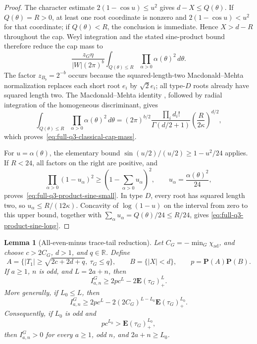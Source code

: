 \documentclass[11pt,reqno]{amsart}
\theoremstyle{plain}
\newtheorem{lemma}[theorem]{Lemma}
\theoremstyle{definition}
\newcommand{\chiad}{\chi_{\mathrm{ad}}}
\begin{document}
\begin{proof}
The character estimate $2(1-\cos u)\leq u^2$ gives
$d-X\leq Q(\theta)$.  If $Q(\theta)=R>0$, at least one root coordinate is
nonzero and $2(1-\cos u)<u^2$ for that coordinate; if $Q(\theta)<R$, the
conclusion is immediate.  Hence $X>d-R$ throughout the cap.  Weyl
integration and the stated sine-product bound
therefore reduce the cap mass to
\[
 \frac{z_G\eta}{|W|(2\pi)^b}
 \int_{Q(\theta)\leq R}\prod_{\alpha>0}\alpha(\theta)^2\,d\theta.
\]
The factor $z_{B_b}=2^{-b}$ occurs because the squared-length-two
Macdonald--Mehta normalization replaces each short root $e_i$ by
$\sqrt2e_i$; all type-$D$ roots already have squared length two.  The
Macdonald--Mehta identity
\cite[Theorem~3.1(i)]{Etingof2009}, followed by radial integration of the
homogeneous discriminant, gives
\[
 \int_{Q(\theta)\leq R}\prod_{\alpha>0}\alpha(\theta)^2\,d\theta
 =(2\pi)^{b/2}\frac{\prod_i d_i!}{\Gamma(d/2+1)}
 \left(\frac{R}{2\kappa}\right)^{d/2},
\]
which proves~\eqref{eq:full-q3-classical-cap-mass}.

For $u=\alpha(\theta)$, the elementary bound
$\sin(u/2)/(u/2)\geq1-u^2/24$ applies.  If $R<24$, all factors on the
right are positive, and
\[
 \prod_{\alpha>0}(1-u_\alpha)^2
 \geq\left(1-\sum_{\alpha>0}u_\alpha\right)^2,
 \qquad u_\alpha=\frac{\alpha(\theta)^2}{24},
\]
proves~\eqref{eq:full-q3-product-sine-small}.  In type $D$, every root has
squared length two, so
$u_\alpha\leq R/(12\kappa)$.  Concavity of $\log(1-u)$ on the interval
from zero to this upper bound, together with
$\sum_\alpha u_\alpha=Q(\theta)/24\leq R/24$, gives
\eqref{eq:full-q3-product-sine-long}.
\end{proof}

\begin{lemma}[All-even-minus trace-tail reduction]
\label{lem:all-minus-trace-tail}
Let $C_G=-\min_G\chiad$, and choose $c>2C_G$, $d>1$, and
$q\in\mathbb R$.  Define
\[
 A=\{|T_1|\geq\sqrt{2c+2d+q},\ \tau_G\leq q\},
 \qquad B=\{|X|<d\},
 \qquad p=\mathbf P(A)\mathbf P(B).
\]
If $a\geq1$, $n$ is odd, and $L=2a+n$, then
\begin{equation}
\label{eq:all-minus-base-tail}
 I^G_{a,n}\geq 2pc^L-2\mathbf E(\tau_G)_+^L.
\end{equation}
More generally, if $L_0\leq L$, then
\begin{equation}
\label{eq:all-minus-propagated-tail}
 I^G_{a,n}\geq
 2pc^L-2(2C_G)^{L-L_0}\mathbf E(\tau_G)_+^{L_0}.
\end{equation}
Consequently, if $L_0$ is odd and
\begin{equation}
\label{eq:all-minus-tail-test}
 pc^{L_0}>\mathbf E(\tau_G)_+^{L_0},
\end{equation}
then $I^G_{a,n}>0$ for every $a\geq1$, odd $n$, and
$2a+n\geq L_0$.
\end{lemma}
\end{document}
